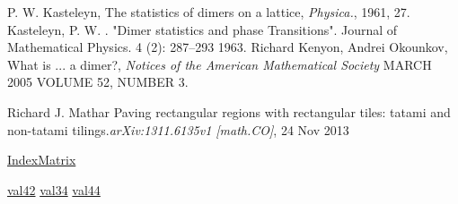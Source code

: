 \documentclass{amsc}          %
\numberwithin{equation}{section} %
\begin{document}

\BeginRef
{} P. W. Kasteleyn, The statistics of dimers on a lattice, {\it Physica.}, 1961, 27.
  Kasteleyn, P. W. . "Dimer statistics and phase Transitions". Journal of Mathematical Physics. 4 (2): 287–293 1963.
 Richard Kenyon, Andrei Okounkov,  What is ... a dimer?, {\it Notices of the American Mathematical Society} MARCH 2005 VOLUME 52, NUMBER 3.

 Richard J. Mathar Paving rectangular regions with rectangular tiles: tatami and non-tatami tilings.{\it arXiv:1311.6135v1 [math.CO]},  24 Nov 2013

 \href{https://github.com/huih1984/Lattice-Tilings-and-Hyperdeterminant/blob/master/vc\%2B\%2B/high\%20dimension\%20matrix/IndexMatrix.cpp}{IndexMatrix}

 \href{https://github.com/huih1984/Lattice-Tilings-and-Hyperdeterminant/blob/master/vc\%2B\%2B/high\%20dimension\%20matrix/out_4_2_1.txt}{val42}
 \href{https://github.com/huih1984/Lattice-Tilings-and-Hyperdeterminant/blob/master/vc\%2B\%2B/high\%20dimension\%20matrix/out_3_4_1.txt}{val34}
 \href{https://github.com/huih1984/Lattice-Tilings-and-Hyperdeterminant/blob/master/vc\%2B\%2B/high\%20dimension\%20matrix/out_4_4_1.txt}{val44}

\EndRef
\end{document}
